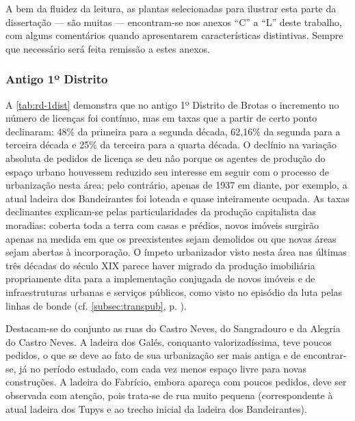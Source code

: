 A bem da fluidez da leitura, as plantas selecionadas para ilustrar esta parte da dissertação --- são muitas --- encontram-se nos anexos ``C'' a ``L'' deste trabalho, com alguns comentários quando apresentarem características distintivas. Sempre que necessário será feita remissão a estes anexos.

\subsubsection{Antigo 1º Distrito}


A \autoref{tab:rd-1dist} demonstra que no antigo 1º Distrito de Brotas o incremento no número de licenças foi contínuo, mas em taxas que a partir de certo ponto declinaram: 48\% da primeira para a segunda década, 62,16\% da segunda para a terceira década e 25\% da terceira para a quarta década. O declínio na variação absoluta de pedidos de licença se deu nâo porque os agentes de produção do espaço urbano houvessem reduzido seu interesse em seguir com o processo de urbanização nesta área; pelo contrário, apenas de 1937 em diante, por exemplo, a atual ladeira dos Bandeirantes foi loteada e quase inteiramente ocupada. As taxas declinantes explicam-se pelas particularidades da produção capitalista das moradias: coberta toda a terra com casas e prédios, novos imóveis surgirão apenas na medida em que os preexistentes sejam demolidos ou que novas áreas sejam abertas à incorporação. O ímpeto urbanizador visto nesta área nas últimas três décadas do século XIX parece haver migrado da produção imobiliária propriamente dita para a implementação conjugada de novos imóveis e de infraestruturas urbanas e serviços públicos, como visto no episódio da luta pelas linhas de bonde (cf. \autoref{subsec:transpub}, p. \pageref{subsec:transpub}).






Destacam-se do conjunto as ruas do Castro Neves, do Sangradouro e da Alegria do Castro Neves. A ladeira dos Galés, conquanto valorizadíssima, teve poucos pedidos, o que se deve ao fato de sua urbanização ser mais antiga e de encontrar-se, já no período estudado, com cada vez menos espaço livre para novas construções. A ladeira do Fabrício, embora apareça com poucos pedidos, deve ser observada com atenção, pois trata-se de rua muito pequena (correspondente à atual ladeira dos Tupys e ao trecho inicial da ladeira dos Bandeirantes).

